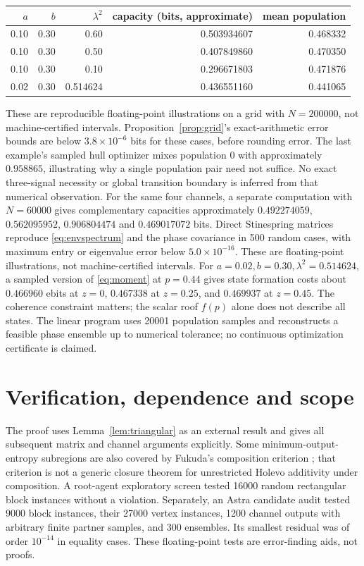 \documentclass[11pt]{article}
\begin{document}
\begin{center}
\begin{tabular}{rrrrr}
\toprule
$a$&$b$&$\lambda^2$&capacity (bits, approximate)&mean population\\
\midrule
0.10&0.30&0.60&0.503934607&0.468332\\
0.10&0.30&0.50&0.407849860&0.470350\\
0.10&0.30&0.10&0.296671803&0.471876\\
0.02&0.30&0.514624&0.436551160&0.441065\\
\bottomrule
\end{tabular}
\end{center}
These are reproducible floating-point illustrations on a grid with $N=200000$, not machine-certified intervals. Proposition~\ref{prop:grid}'s exact-arithmetic error bounds are below $3.8\times10^{-6}$ bits for these cases, before rounding error. The last example's sampled hull optimizer mixes population $0$ with approximately $0.958865$, illustrating why a single population pair need not suffice. No exact three-signal necessity or global transition boundary is inferred from that numerical observation. For the same four channels, a separate computation with $N=60000$ gives complementary capacities approximately $0.492274059$, $0.562095952$, $0.906804474$ and $0.469017072$ bits. Direct Stinespring matrices reproduce \eqref{eq:envspectrum} and the phase covariance in 500 random cases, with maximum entry or eigenvalue error below $5.0\times10^{-16}$. These are floating-point illustrations, not machine-certified intervals. For $a=0.02,b=0.30,\lambda^2=0.514624$, a sampled version of \eqref{eq:moment} at $p=0.44$ gives state formation costs about $0.466960$ ebits at $z=0$, $0.467338$ at $z=0.25$, and $0.469937$ at $z=0.45$. The coherence constraint matters; the scalar roof $f(p)$ alone does not describe all states. The linear program uses 20001 population samples and reconstructs a feasible phase ensemble up to numerical tolerance; no continuous optimization certificate is claimed.

\section{Verification, dependence and scope}
The proof uses Lemma~\ref{lem:triangular} as an external result and gives all subsequent matrix and channel arguments explicitly. Some minimum-output-entropy subregions are also covered by Fukuda's composition criterion \cite{fukuda}; that criterion is not a generic closure theorem for unrestricted Holevo additivity under composition. A root-agent exploratory screen tested 16000 random rectangular block instances without a violation. Separately, an Astra candidate audit tested 9000 block instances, their 27000 vertex instances, 1200 channel outputs with arbitrary finite partner samples, and 300 ensembles. Its smallest residual was of order $10^{-14}$ in equality cases. These floating-point tests are error-finding aids, not proofs.
\end{document}
